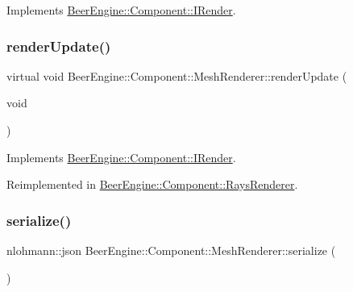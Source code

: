 Implements \mbox{\hyperlink{class_beer_engine_1_1_component_1_1_i_render_a021864acc1288b34b13f8766735ebcc0}{Beer\+Engine\+::\+Component\+::\+I\+Render}}.

\mbox{\label{class_beer_engine_1_1_component_1_1_mesh_renderer_abca4caa865363fdccb1b0c6fc6f7c81d}} 
\subsubsection{\texorpdfstring{render\+Update()}{renderUpdate()}}
{\footnotesize\ttfamily virtual void Beer\+Engine\+::\+Component\+::\+Mesh\+Renderer\+::render\+Update (\begin{DoxyParamCaption}\item[{void}]{ }\end{DoxyParamCaption})\hspace{0.3cm}{\ttfamily [virtual]}}



Implements \mbox{\hyperlink{class_beer_engine_1_1_component_1_1_i_render_aef1ff4ddcdf216d290c747edd86bd99e}{Beer\+Engine\+::\+Component\+::\+I\+Render}}.



Reimplemented in \mbox{\hyperlink{class_beer_engine_1_1_component_1_1_rays_renderer_a1647c9a5f40fc9186ccb6d55b7ebfe5e}{Beer\+Engine\+::\+Component\+::\+Rays\+Renderer}}.

\mbox{\label{class_beer_engine_1_1_component_1_1_mesh_renderer_a65c6c22ae40b5b94f590c3a8bf14d0d0}} 
\subsubsection{\texorpdfstring{serialize()}{serialize()}}
{\footnotesize\ttfamily nlohmann\+::json Beer\+Engine\+::\+Component\+::\+Mesh\+Renderer\+::serialize (\begin{DoxyParamCaption}{ }\end{DoxyParamCaption})\hspace{0.3cm}{\ttfamily [virtual]}}



